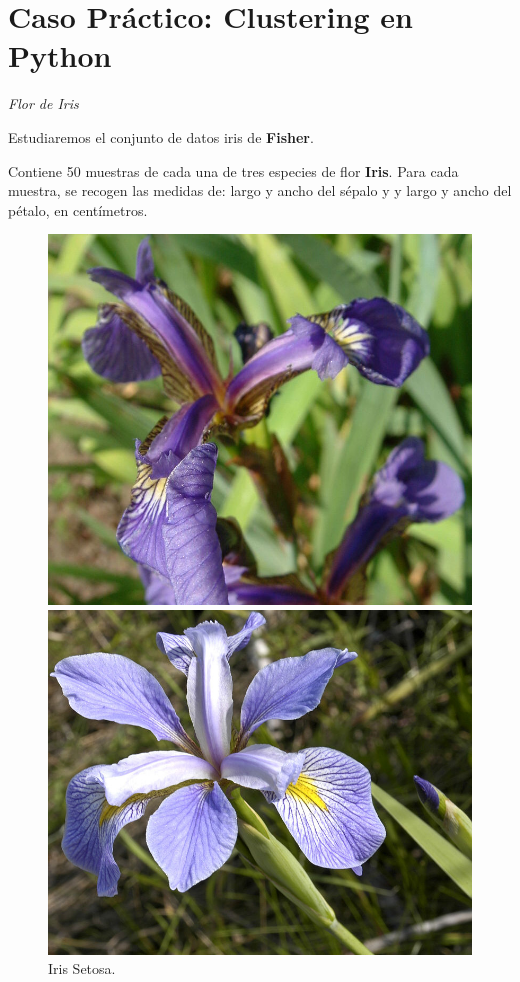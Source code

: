 \documentclass[spanish]{beamer}
\begin{document}

\section{Caso Práctico: Clustering en Python}

\begin{frame}{\textit{Flor de Iris}}

Estudiaremos el conjunto de datos iris de \textbf{Fisher}.\break

Contiene 50 muestras de cada una de tres especies de flor \textbf{Iris}. Para cada muestra, se recogen las medidas de: largo y ancho del sépalo y y largo y ancho del pétalo, en centímetros.

\begin{figure}[h]
  \centering
  \begin{minipage}[h]{0.28\textwidth}
    \includegraphics[width=\textwidth]{dani/setosa.jpg}
    \caption{Iris Setosa.}
  \end{minipage}
  \hfill
  \begin{minipage}[h]{0.28\textwidth}
    \includegraphics[width=\textwidth]{dani/virginica.jpg}

\end{minipage}
\end{figure}
\end{frame}
\end{document}
